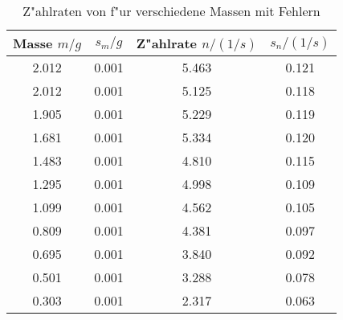 \begin{table}[H]
\caption{Z"ahlraten von \kalium f"ur verschiedene Massen mit Fehlern}
\begin{center}
\begin{tabular}{|c|c|c|c|}
  \hline
  Masse $m / g$ & $s_m / g$  & Z"ahlrate $n / (1/s)$ & $s_n / (1/s)$ \\ \hline 
  2.012 & 0.001 & 5.463 & 0.121 \\ \hline
  2.012 & 0.001 & 5.125 & 0.118 \\ \hline
  1.905 & 0.001 & 5.229 & 0.119 \\ \hline
  1.681 & 0.001 & 5.334 & 0.120 \\ \hline
  1.483 & 0.001 & 4.810 & 0.115 \\ \hline
  1.295 & 0.001 & 4.998 & 0.109 \\ \hline
  1.099 & 0.001 & 4.562 & 0.105 \\ \hline
  0.809 & 0.001 & 4.381 & 0.097 \\ \hline
  0.695 & 0.001 & 3.840 & 0.092 \\ \hline
  0.501 & 0.001 & 3.288 & 0.078 \\ \hline
  0.303 & 0.001 & 2.317 & 0.063 \\ \hline
\end{tabular}
\end{center}
\label{tab:data:kalium}
\end{table}
